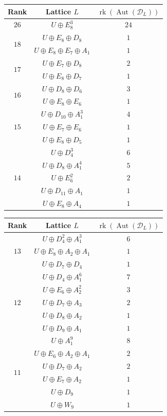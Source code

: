 \documentclass[11pt,letterpaper]{amsart}
\DeclareMathOperator{\rk}{rk}
\DeclareMathOperator{\Aut}{Aut}
\begin{document}
\begin{table}
\centering
\begin{tabular}{ c | c | c} 
  Rank &Lattice $L$ &$\rk(\Aut(\mathcal{D}_L))$ \\
  \hline
  \hline
  \multirow{1}{1.5em}{$26$} 
&$U\oplus E_8^3$ &$24$\\
  \hline
\multirow{2}{1.5em}{$18$} 
&$U\oplus E_8\oplus D_8$ &$1$ \\
&$U\oplus E_8\oplus E_7\oplus A_1$ &$1$ \\
  \hline
\multirow{2}{1.5em}{$17$}
&$U\oplus E_7\oplus D_8$ &$2$ \\
&$U\oplus E_8\oplus D_7$ &$1$\\
  \hline
\multirow{2}{1.5em}{$16$}
&$U\oplus D_8\oplus D_6$ &$3$ \\
&$U\oplus E_8\oplus E_6$ &$1$ \\
  \hline
  \multirow{3}{1.5em}{$15$} 
  &$U\oplus D_{10}\oplus A_1^3$ &$4$ \\
&$U\oplus E_7\oplus E_6$ &$1$ \\
&$U\oplus E_8\oplus D_5$ &$1$ \\
\hline
\multirow{5}{1.5em}{$14$}
&$U\oplus D_4^3$ &$6$ \\
&$U\oplus D_8\oplus A_1^4$ &$5$ \\
&$U\oplus E_6^2$ &$2$ \\
&$U\oplus D_{11}\oplus A_1$ &$1$ \\
&$U\oplus E_8\oplus A_4$ &$1$ \\
\end{tabular}
\quad
\begin{tabular}{ c | c | c } 
  Rank &Lattice $L$ &$\rk(\Aut(\mathcal{D}_L))$ \\
  \hline
  \hline
\multirow{3}{1.5em}{$13$}
&$U\oplus D_4^2\oplus A_1^3$ &$6$\\
&$U\oplus E_8\oplus A_2\oplus A_1$ &$1$\\
&$U\oplus D_7\oplus D_4$ &$1$\\
\hline
\multirow{5}{1.5em}{$12$}
&$U\oplus D_4\oplus A_1^6$ &$7$ \\
&$U\oplus E_6\oplus A_2^2$ &$3$\\
&$U\oplus D_7\oplus A_3$ &$2$ \\
&$U\oplus D_8\oplus A_2$ &$1$ \\
&$U\oplus D_9\oplus A_1$ &$1$\\
  \hline
\multirow{6}{1.5em}{$11$} 
&$U\oplus A_1^{9}$ &$8$\\
&$U\oplus E_6\oplus A_2\oplus A_1$ &$2$\\
&$U\oplus D_7\oplus A_2$ &$2$\\
&$U\oplus E_7\oplus A_2$ &$1$ \\
&$U\oplus D_9$ &$1$ \\
&$U\oplus W_9$ &$1$\\
\end{tabular}
\quad


\end{table}
\end{document}
